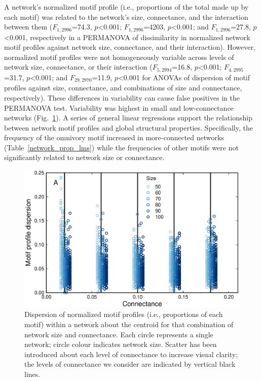 \documentclass[12pt]{article}
\begin{document}
\begin{spacing}{2.0}
    A network's normalized motif profile (i.e., proportions of the total made up by each motif) was related to the network's size, connectance, and the interaction between them ($F_{1,2996}$=74.3, $p$\textless0.001; $F_{1,2996}$=4203, $p$\textless0.001; and $F_{1,2996}$=27.8, $p$\textless0.001, respectively in a PERMANOVA of dissimilarity in normalized network motif profiles against network size, connectance, and their interaction).
    However, normalized motif profiles were not homogeneously variable across levels of network size, connectance, or their interaction  ($F_{5,2994}$=16.8, $p$\textless0.001; $F_{4,2995}$=31.7, $p$\textless0.001; and $F_{29,2970}$=11.9, $p$\textless0.001 for ANOVAs of dispersion of motif profiles against size, connectance, and combinations of size and connectance, respectively). 
    These differences in variability can cause false positives in the PERMANOVA test. Variability was highest in small and low-connectance networks (Fig.~\ref{dispersion_normmotifs}).
    A series of general linear regressions support the relationship between network motif profiles and global structural properties.
    Specifically, the frequency of the omnivory motif increased in more-connected networks (Table~\ref{network_prop_lms}) while the frequencies of other motifs were not significantly related to network size or connectance.


   \begin{figure}[hb!]
       \centering
       \includegraphics[width=.75\textwidth]{figures/proportion_profile_dispersion.eps}
       \caption{Dispersion of normalized motif profiles (i.e., proportions of each motif) within a network about the centroid for that combination of network size and connectance. Each circle represents a single network; circle colour indicates network size. Scatter has been introduced about each level of connectance to increase visual clarity; the levels of connectance we consider are indicated by vertical black lines.}
       \label{dispersion_normmotifs}
    \end{figure}



\end{spacing}
\end{document}

